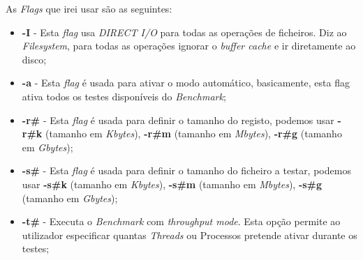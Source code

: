 \documentclass[conference,compsoc]{IEEEtran}
\begin{document}
As \textit{Flags} que irei usar são as seguintes:
\begin{itemize}
	\item \textbf{-I} - Esta \textit{flag} usa \textit{DIRECT I/O} para todas as operações de ficheiros. Diz ao \textit{Filesystem}, para todas as operações ignorar o \textit{buffer cache} e ir diretamente ao disco;
	\item \textbf{-a} - Esta \textit{flag} é usada para ativar o modo automático, basicamente, esta flag ativa todos os testes disponíveis do \textit{Benchmark};
	\item \textbf{-r\#} - Esta \textit{flag} é usada para definir o tamanho do registo, podemos usar \textbf{-r\#k} (tamanho em \textit{Kbytes}), 	\textbf{-r\#m} (tamanho em \textit{Mbytes}), \textbf{-r\#g} (tamanho em \textit{Gbytes});
	\item \textbf{-s\#} - Esta \textit{flag} é usada para definir o tamanho do ficheiro a testar, podemos usar \textbf{-s\#k} (tamanho em \textit{Kbytes}), 	\textbf{-s\#m} (tamanho em \textit{Mbytes}), \textbf{-s\#g} (tamanho em \textit{Gbytes});
	\item \textbf{-t\#} - Executa o \textit{Benchmark} com \textit{throughput mode}. Esta opção permite ao utilizador especificar quantas \textit{Threads} ou Processos pretende ativar durante os testes;
\end{itemize}
\end{document}
